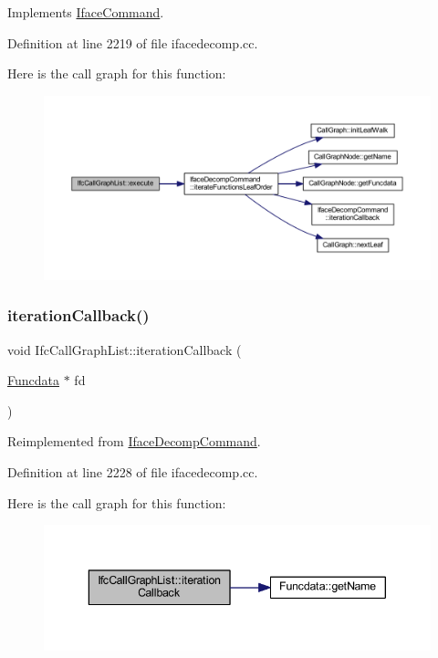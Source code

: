 Implements \mbox{\hyperlink{class_iface_command_af10e29cee2c8e419de6efe9e680ad201}{Iface\+Command}}.



Definition at line 2219 of file ifacedecomp.\+cc.

Here is the call graph for this function\+:
\nopagebreak
\begin{figure}[H]
\begin{center}
\leavevmode
\includegraphics[width=350pt]{class_ifc_call_graph_list_ac481079688c06e5250db1b8ea81e8cc7_cgraph}
\end{center}
\end{figure}
\mbox{\label{class_ifc_call_graph_list_aa7250e67ebde654dd6792caf88186f6c}} 
\subsubsection{\texorpdfstring{iterationCallback()}{iterationCallback()}}
{\footnotesize\ttfamily void Ifc\+Call\+Graph\+List\+::iteration\+Callback (\begin{DoxyParamCaption}\item[{\mbox{\hyperlink{class_funcdata}{Funcdata}} $\ast$}]{fd }\end{DoxyParamCaption})\hspace{0.3cm}{\ttfamily [virtual]}}



Reimplemented from \mbox{\hyperlink{class_iface_decomp_command_a619d9358a4e77bef66a26f02ea7a6c8e}{Iface\+Decomp\+Command}}.



Definition at line 2228 of file ifacedecomp.\+cc.

Here is the call graph for this function\+:
\nopagebreak
\begin{figure}[H]
\begin{center}
\leavevmode
\includegraphics[width=343pt]{class_ifc_call_graph_list_aa7250e67ebde654dd6792caf88186f6c_cgraph}
\end{center}
\end{figure}


